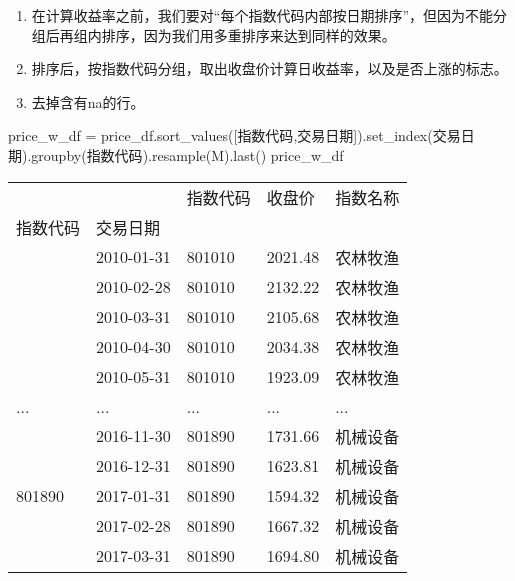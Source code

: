 \documentclass[
  letterpaper,
  DIV=11,
  numbers=noendperiod]{scrreprt}
\newenvironment{Shaded}{\begin{snugshade}}{\end{snugshade}}
\newcommand{\NormalTok}[1]{\textcolor[rgb]{0.00,0.23,0.31}{#1}}
\newcommand{\OperatorTok}[1]{\textcolor[rgb]{0.37,0.37,0.37}{#1}}
\newcommand{\StringTok}[1]{\textcolor[rgb]{0.13,0.47,0.30}{#1}}
\providecommand{\tightlist}{%
  \setlength{\itemsep}{0pt}\setlength{\parskip}{0pt}}\usepackage{longtable,booktabs,array}
\begin{document}
\begin{enumerate}
\def\labelenumi{\arabic{enumi}.}
\tightlist
\item
  在计算收益率之前，我们要对``每个指数代码内部按日期排序''，但因为不能分组后再组内排序，因为我们用多重排序来达到同样的效果。
\item
  排序后，按指数代码分组，取出收盘价计算日收益率，以及是否上涨的标志。
\item
  去掉含有na的行。
\end{enumerate}

\begin{Shaded}
\begin{Highlighting}[]
\NormalTok{price\_w\_df }\OperatorTok{=}\NormalTok{ price\_df.sort\_values([}\StringTok{\textquotesingle{}指数代码\textquotesingle{}}\NormalTok{,}\StringTok{\textquotesingle{}交易日期\textquotesingle{}}\NormalTok{]).set\_index(}\StringTok{\textquotesingle{}交易日期\textquotesingle{}}\NormalTok{).groupby(}\StringTok{\textquotesingle{}指数代码\textquotesingle{}}\NormalTok{).resample(}\StringTok{\textquotesingle{}M\textquotesingle{}}\NormalTok{).last()}
\NormalTok{price\_w\_df}
\end{Highlighting}
\end{Shaded}

\begin{longtable}[]{@{}lllll@{}}
\toprule\noalign{}
& & 指数代码 & 收盘价 & 指数名称 \\
指数代码 & 交易日期 & & & \\
\midrule\noalign{}
\endhead
\bottomrule\noalign{}
\endlastfoot
\multirow{5}{*}{801010} & 2010-01-31 & 801010 & 2021.48 & 农林牧渔 \\
& 2010-02-28 & 801010 & 2132.22 & 农林牧渔 \\
& 2010-03-31 & 801010 & 2105.68 & 农林牧渔 \\
& 2010-04-30 & 801010 & 2034.38 & 农林牧渔 \\
& 2010-05-31 & 801010 & 1923.09 & 农林牧渔 \\
... & ... & ... & ... & ... \\
\multirow{5}{*}{801890} & 2016-11-30 & 801890 & 1731.66 & 机械设备 \\
& 2016-12-31 & 801890 & 1623.81 & 机械设备 \\
& 2017-01-31 & 801890 & 1594.32 & 机械设备 \\
& 2017-02-28 & 801890 & 1667.32 & 机械设备 \\
& 2017-03-31 & 801890 & 1694.80 & 机械设备 \\
\end{longtable}
\end{document}
